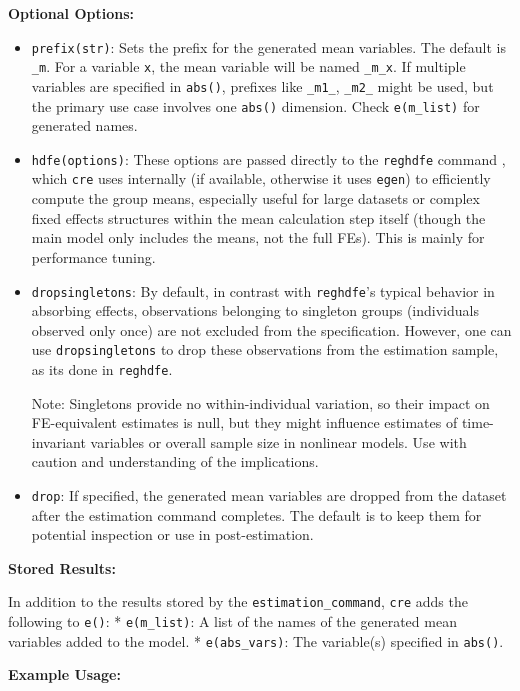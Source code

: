 \documentclass[bib]{statapress}
\begin{document}
\textbf{Optional Options:}

\begin{itemize}
\item
  \texttt{prefix(str)}: Sets the prefix for the generated mean
  variables. The default is \texttt{\_m}. For a variable \texttt{x}, the
  mean variable will be named \texttt{\_m\_x}. If multiple variables are
  specified in \texttt{abs()}, prefixes like \texttt{\_m1\_},
  \texttt{\_m2\_} might be used, but the primary use case involves one
  \texttt{abs()} dimension. Check \texttt{e(m\_list)} for generated
  names.
\item
  \texttt{hdfe(options)}: These options are passed directly to the
  \texttt{reghdfe} command \citep{correia_2016}, which \texttt{cre} uses
  internally (if available, otherwise it uses \texttt{egen}) to
  efficiently compute the group means, especially useful for large
  datasets or complex fixed effects structures within the mean
  calculation step itself (though the main model only includes the
  means, not the full FEs). This is mainly for performance tuning.
\item
  \texttt{dropsingletons}: By default, in contrast with
  \texttt{reghdfe}'s typical behavior in absorbing effects, observations
  belonging to singleton groups (individuals observed only once) are not
  excluded from the specification. However, one can use
  \texttt{dropsingletons} to drop these observations from the estimation
  sample, as its done in \texttt{reghdfe}.

  Note: Singletons provide no within-individual variation, so their
  impact on FE-equivalent estimates is null, but they might influence
  estimates of time-invariant variables or overall sample size in
  nonlinear models. Use with caution and understanding of the
  implications.
\item
  \texttt{drop}: If specified, the generated mean variables are dropped
  from the dataset after the estimation command completes. The default
  is to keep them for potential inspection or use in post-estimation.
\end{itemize}

\textbf{Stored Results:}

In addition to the results stored by the \texttt{estimation\_command},
\texttt{cre} adds the following to \texttt{e()}: * \texttt{e(m\_list)}:
A list of the names of the generated mean variables added to the model.
* \texttt{e(abs\_vars)}: The variable(s) specified in \texttt{abs()}.

\textbf{Example Usage:}
\end{document}

